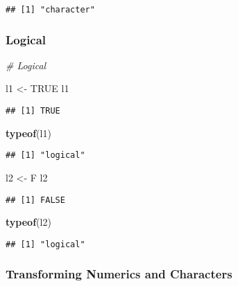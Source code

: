 \documentclass[
]{article}
\newenvironment{Shaded}{\begin{snugshade}}{\end{snugshade}}
\newcommand{\CommentTok}[1]{\textcolor[rgb]{0.56,0.35,0.01}{\textit{#1}}}
\newcommand{\ConstantTok}[1]{\textcolor[rgb]{0.56,0.35,0.01}{#1}}
\newcommand{\FunctionTok}[1]{\textcolor[rgb]{0.13,0.29,0.53}{\textbf{#1}}}
\newcommand{\NormalTok}[1]{#1}
\newcommand{\OtherTok}[1]{\textcolor[rgb]{0.56,0.35,0.01}{#1}}
\begin{document}
\begin{verbatim}
## [1] "character"
\end{verbatim}

\subsubsection{Logical}\label{logical}

\begin{Shaded}
\begin{Highlighting}[]
\CommentTok{\# Logical}

\NormalTok{l1 }\OtherTok{\textless{}{-}} \ConstantTok{TRUE}
\NormalTok{l1}
\end{Highlighting}
\end{Shaded}

\begin{verbatim}
## [1] TRUE
\end{verbatim}

\begin{Shaded}
\begin{Highlighting}[]
\FunctionTok{typeof}\NormalTok{(l1)}
\end{Highlighting}
\end{Shaded}

\begin{verbatim}
## [1] "logical"
\end{verbatim}

\begin{Shaded}
\begin{Highlighting}[]
\NormalTok{l2 }\OtherTok{\textless{}{-}}\NormalTok{ F}
\NormalTok{l2}
\end{Highlighting}
\end{Shaded}

\begin{verbatim}
## [1] FALSE
\end{verbatim}

\begin{Shaded}
\begin{Highlighting}[]
\FunctionTok{typeof}\NormalTok{(l2)}
\end{Highlighting}
\end{Shaded}

\begin{verbatim}
## [1] "logical"
\end{verbatim}

\subsubsection{Transforming Numerics and
Characters}\label{transforming-numerics-and-characters}
\end{document}
